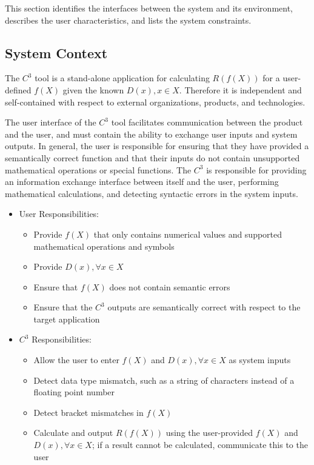 \documentclass[12pt]{article}
\newcommand{\prognameAbbrv}{$C^{3}$}
\begin{document}
This section identifies the interfaces between the system and its environment,
describes the user characteristics, and lists the system constraints.

\subsection{System Context}
The \prognameAbbrv{} tool is a stand-alone application for calculating 
$R(f(X))$ for a user-defined $f(X)$ given the known $D(x), x\in X$. Therefore 
it is independent and self-contained with respect to external organizations, 
products, and technologies.

The user interface of the \prognameAbbrv{} tool facilitates communication 
between the product and the user, and must contain the ability to exchange user 
inputs and system outputs. In general, the user is responsible for ensuring 
that they have provided a semantically correct function and that their inputs 
do not contain unsupported mathematical operations or special functions. The 
\prognameAbbrv{} is responsible for providing an information exchange interface 
between itself and the user, performing mathematical calculations, and 
detecting syntactic errors in the system inputs.

\begin{itemize}
	\item User Responsibilities:
	\begin{itemize}
		\item Provide $f(X)$ that only contains numerical values and supported 
		mathematical operations and symbols
		\item Provide $D(x), \forall x\in X$
		\item Ensure that $f(X)$ does not contain semantic errors
		\item Ensure that the \prognameAbbrv{} outputs are semantically correct 
		with respect to the target application
	\end{itemize}
	\item \prognameAbbrv{} Responsibilities:
	\begin{itemize}
		\item Allow the user to enter $f(X)$ and $D(x), \forall x\in X$	as 
		system inputs
		\item Detect data type mismatch, such as a string of characters instead 
		of a floating point number
		\item Detect bracket mismatches in $f(X)$
		\item Calculate and output $R(f(X))$ using the user-provided $f(X)$ and 
		$D(x), \forall x\in X$; if a result cannot be calculated, communicate 
		this to the user
	\end{itemize}
\end{itemize}
\end{document}
